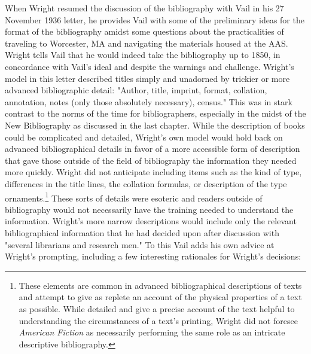 When Wright resumed the discussion of the bibliography with Vail in his 27 November 1936 letter, he provides Vail with some of the preliminary ideas for the format of the bibliography amidst some questions about the practicalities of traveling to Worcester, MA and navigating the materials housed at the AAS. Wright tells Vail that he would indeed take the bibliography up to 1850, in concordance with Vail's ideal and despite the warnings and challenge. Wright's model in this letter described titles simply and unadorned by trickier or more advanced bibliographic detail: "Author, title, imprint, format, collation, annotation, notes (only those absolutely necessary), census." This was in stark contrast to the norms of the time for bibliographers, especially in the midst of the New Bibliography as discussed in the last chapter. While the description of books could be complicated and detailed, Wright's own model would hold back on advanced bibliographical details in favor of a more accessible form of description that gave those outside of the field of bibliography the information they needed more quickly. Wright did not anticipate including items such as the kind of type, differences in the title lines, the collation formulas, or description of the type ornaments.\footnote{These elements are common in advanced bibliographical descriptions of texts and attempt to give as replete an account of the physical properties of a text as possible. While detailed and give a precise account of the text helpful to understanding the circumstances of a text's printing, Wright did not foresee \textit{American Fiction} as necessarily performing the same role as an intricate descriptive bibliography.} These sorts of details were esoteric and readers outside of bibliography would not necessarily have the training needed to understand the information. Wright's more narrow descriptions would include only the relevant bibliographical information that he had decided upon after discussion with "several librarians and research men."\autocite{lyle_h._wright_letter_1936-1} To this Vail adds his own advice at Wright's prompting, including a few interesting rationales for Wright's decisions: 

